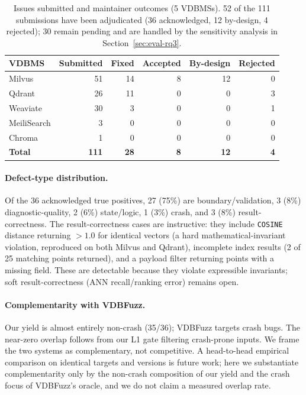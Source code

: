 \documentclass[sigconf]{acmart}
\begin{document}
\begin{table}[t]
\caption{Issues submitted and maintainer outcomes (5 VDBMSs). 52 of the 111 submissions have been adjudicated (36 acknowledged, 12 by-design, 4 rejected); 30 remain pending and are handled by the sensitivity analysis in Section~\ref{sec:eval-rq3}.}
\label{tab:yield}
\small
\begin{tabular}{lrrrrr}
\toprule
VDBMS & Submitted & Fixed & Accepted & By-design & Rejected \\
\midrule
Milvus      & 51 & 14 & 8 & 12 & 0 \\
Qdrant      & 26 & 11 & 0 & 0  & 3 \\
Weaviate    & 30 & 3  & 0 & 0  & 1 \\
MeiliSearch & 3  & 0  & 0 & 0  & 0 \\
Chroma      & 1  & 0  & 0 & 0  & 0 \\
\midrule
\textbf{Total} & \textbf{111} & \textbf{28} & \textbf{8} & \textbf{12} & \textbf{4} \\
\bottomrule
\end{tabular}
\end{table}

\paragraph{Defect-type distribution.} Of the 36 acknowledged true positives, 27 (75\%) are boundary/validation, 3 (8\%) diagnostic-quality, 2 (6\%) state/logic, 1 (3\%) crash, and 3 (8\%) result-correctness. The result-correctness cases are instructive: they include \texttt{COSINE} distance returning $>1.0$ for identical vectors (a hard mathematical-invariant violation, reproduced on both Milvus and Qdrant), incomplete index results (2 of 25 matching points returned), and a payload filter returning points with a missing field. These are detectable because they violate expressible invariants; soft result-correctness (ANN recall/ranking error) remains open.

\paragraph{Complementarity with VDBFuzz.} Our yield is almost entirely non-crash (35/36); VDBFuzz targets crash bugs. The near-zero overlap follows from our L1 gate filtering crash-prone inputs. We frame the two systems as complementary, not competitive. A head-to-head empirical comparison on identical targets and versions is future work; here we substantiate complementarity only by the non-crash composition of our yield and the crash focus of VDBFuzz's oracle, and we do not claim a measured overlap rate.
\end{document}
